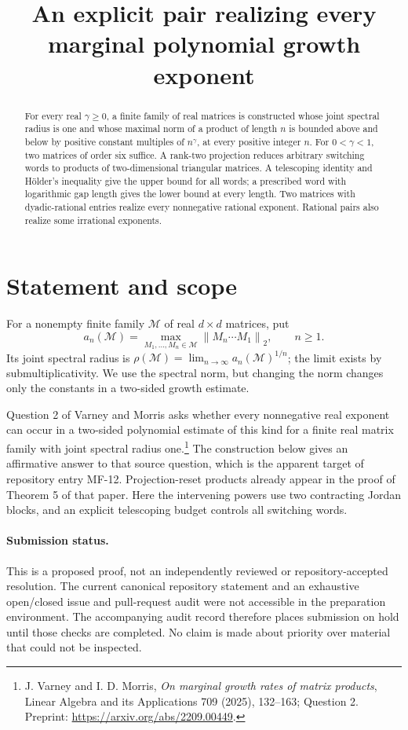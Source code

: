 \documentclass[11pt]{article}
\title{An explicit pair realizing every marginal polynomial growth exponent}
\author{}\date{}
\theoremstyle{remark}\newtheorem{remark}[theorem]{Remark}
\newcommand{\norm}[1]{\left\lVert #1\right\rVert_2}
\newcommand{\jsr}{\rho}
\begin{document}
\maketitle
\vspace{-2em}
\begin{abstract}
For every real $\gamma\geq0$, a finite family of real matrices is constructed whose joint spectral radius is one and whose maximal norm of a product of length $n$ is bounded above and below by positive constant multiples of $n^\gamma$, at every positive integer $n$. For $0<\gamma<1$, two matrices of order six suffice. A rank-two projection reduces arbitrary switching words to products of two-dimensional triangular matrices. A telescoping identity and H\"older's inequality give the upper bound for all words; a prescribed word with logarithmic gap length gives the lower bound at every length. Two matrices with dyadic-rational entries realize every nonnegative rational exponent. Rational pairs also realize some irrational exponents.
\end{abstract}

\section{Statement and scope}
For a nonempty finite family $\mathcal M$ of real $d\times d$ matrices, put
\[
 a_n(\mathcal M)=\max_{M_1,\ldots,M_n\in\mathcal M}
                 \norm{M_n\cdots M_1},\qquad n\geq1.
\]
Its joint spectral radius is $\jsr(\mathcal M)=\lim_{n\to\infty}a_n(\mathcal M)^{1/n}$; the limit exists by submultiplicativity. We use the spectral norm, but changing the norm changes only the constants in a two-sided growth estimate.

Question 2 of Varney and Morris asks whether every nonnegative real exponent can occur in a two-sided polynomial estimate of this kind for a finite real matrix family with joint spectral radius one.\footnote{J. Varney and I. D. Morris, \emph{On marginal growth rates of matrix products}, Linear Algebra and its Applications 709 (2025), 132--163; Question 2. Preprint: \url{https://arxiv.org/abs/2209.00449}.} The construction below gives an affirmative answer to that source question, which is the apparent target of repository entry MF-12. Projection-reset products already appear in the proof of Theorem 5 of that paper. Here the intervening powers use two contracting Jordan blocks, and an explicit telescoping budget controls all switching words.

\paragraph{Submission status.}
This is a proposed proof, not an independently reviewed or repository-accepted resolution. The current canonical repository statement and an exhaustive open/closed issue and pull-request audit were not accessible in the preparation environment. The accompanying audit record therefore places submission on hold until those checks are completed. No claim is made about priority over material that could not be inspected.
\end{document}
